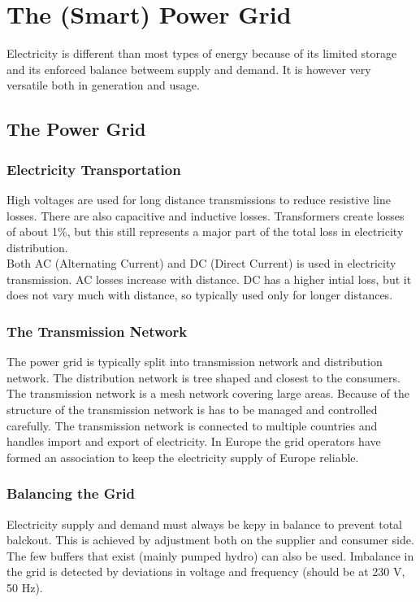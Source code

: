 \section{The (Smart) Power Grid}
Electricity is different than most types of energy because of its limited storage and its enforced balance betweem supply and demand. It is however very versatile both in generation and usage.

\subsection{The Power Grid}

\subsubsection{Electricity Transportation}
High voltages are used for long distance transmissions to reduce resistive line losses. There are also capacitive and inductive losses.
Transformers create losses of about 1\%, but this still represents a major part of the total loss in electricity distribution.\\

Both AC (Alternating Current) and DC (Direct Current) is used in electricity transmission.
AC losses increase with distance.
DC has a higher intial loss, but it does not vary much with distance, so typically used only for longer distances.

\subsubsection{The Transmission Network}
The power grid is typically split into transmission network and distribution network.
The distribution network is tree shaped and closest to the consumers.
The transmission network is a mesh network covering large areas.
Because of the structure of the transmission network is has to be managed and controlled carefully.
The transmission network is connected to multiple countries and handles import and export of electricity. In Europe the grid operators have formed an association to keep the electricity supply of Europe reliable.

\subsubsection{Balancing the Grid}
Electricity supply and demand must always be kepy in balance to prevent total balckout.
This is achieved by adjustment both on the supplier and consumer side.
The few buffers that exist (mainly pumped hydro) can also be used. Imbalance in the grid is detected by deviations in voltage and frequency (should be at 230 V, 50 Hz).\\


